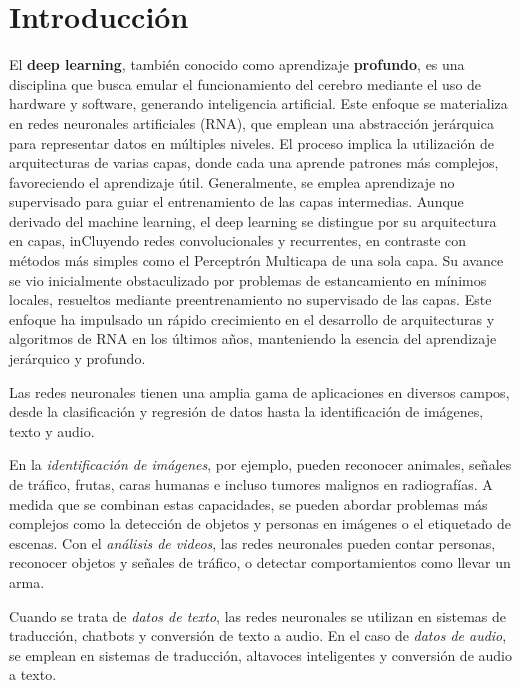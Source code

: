 \documentclass[
  a4paper,
  DIV=11,
  numbers=noendperiod]{scrreprt}
\begin{document}
\section{Introducción}\label{introducciuxf3n-1}

El \textbf{deep learning}, también conocido como aprendizaje
\textbf{profundo}, es una disciplina que busca emular el funcionamiento
del cerebro mediante el uso de hardware y software, generando
inteligencia artificial. Este enfoque se materializa en redes neuronales
artificiales (RNA), que emplean una abstracción jerárquica para
representar datos en múltiples niveles. El proceso implica la
utilización de arquitecturas de varias capas, donde cada una aprende
patrones más complejos, favoreciendo el aprendizaje útil. Generalmente,
se emplea aprendizaje no supervisado para guiar el entrenamiento de las
capas intermedias. Aunque derivado del machine learning, el deep
learning se distingue por su arquitectura en capas, inCluyendo redes
convolucionales y recurrentes, en contraste con métodos más simples como
el Perceptrón Multicapa de una sola capa. Su avance se vio inicialmente
obstaculizado por problemas de estancamiento en mínimos locales,
resueltos mediante preentrenamiento no supervisado de las capas. Este
enfoque ha impulsado un rápido crecimiento en el desarrollo de
arquitecturas y algoritmos de RNA en los últimos años, manteniendo la
esencia del aprendizaje jerárquico y profundo.

Las redes neuronales tienen una amplia gama de aplicaciones en diversos
campos, desde la clasificación y regresión de datos hasta la
identificación de imágenes, texto y audio.

En la \emph{identificación de imágenes}, por ejemplo, pueden reconocer
animales, señales de tráfico, frutas, caras humanas e incluso tumores
malignos en radiografías. A medida que se combinan estas capacidades, se
pueden abordar problemas más complejos como la detección de objetos y
personas en imágenes o el etiquetado de escenas. Con el \emph{análisis
de videos}, las redes neuronales pueden contar personas, reconocer
objetos y señales de tráfico, o detectar comportamientos como llevar un
arma.

Cuando se trata de \emph{datos de texto}, las redes neuronales se
utilizan en sistemas de traducción, chatbots y conversión de texto a
audio. En el caso de \emph{datos de audio}, se emplean en sistemas de
traducción, altavoces inteligentes y conversión de audio a texto.
\end{document}
